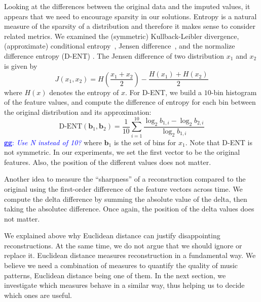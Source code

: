 \documentclass{article}
\newcommand{\FIXME}[2][FIXME]{\textcolor{blue}{\textbf{#1}: \emph{#2}}}
\begin{document}
Looking at the differences between the original data and the imputed
values, it appears that we need to encourage sparsity in our
solutions.  Entropy is a natural measure of the sparsity of a
distribution and therefore it makes sense to consider related metrics.
We examined the (symmetric) Kullback-Leibler divergence, (approximate)
conditional entropy~\cite{Peng2005}, Jensen
difference~\cite{Michel1994}, and the normalize difference entropy
(D-ENT) \cite{Mentzelopoulos2004}.  The Jensen difference of two
distribution $x_1$ and $x_2$ is given by
%
$$
J(x_1,x_2) = H\left(\frac{x_1+x_2}{2}\right) - \frac{H(x_1) + H(x_2)}{2}
$$
%
where $H(x)$ denotes the entropy of $x$.  For D-ENT, we build a
$10$-bin histogram of the feature values, and compute the difference
of entropy for each bin between the original distribution and its
approximation:
$$
\mbox{D-ENT}(\mathbf{b}_1,\mathbf{b}_2) = \frac{1}{10}\sum_{i=1}^{10} \frac{\log_2 b_{1,i} - \log_2 b_{2,i}}{\log_2 b_{1,i}} %
$$
\FIXME[gg]{Use N instead of 10?}
where $\mathbf{b}_1$ is the set of bins for $x_1$.  Note that D-ENT is
not symmetric. In our experiments, we set the first vector to be the
original features. Also, the position of the different values does not
matter.

Another idea to measure the ``sharpness'' of a reconstruction compared
to the original using the first-order difference of the feature
vectors across time. We compute the  delta difference by summing
the absolute value of the delta, then taking the absolutec
difference. Once again, the position of the delta values does not
matter.

We explained above why Euclidean distance can justify disappointing
reconstructions. At the same time, we do not argue that we should
ignore or replace it. Euclidean distance measures reconstruction in a
fundamental way. We believe we need a combination of measures to
quantify the quality of music patterns, Euclidean distance being one
of them. In the next section, we investigate which measures behave in
a similar way, thus helping us to decide which ones are useful.
\end{document}
